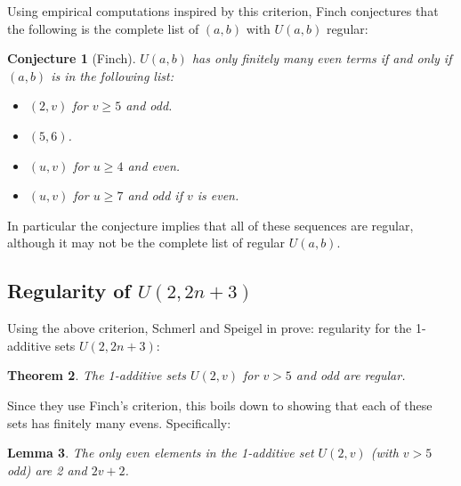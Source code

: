 \documentclass{report}
\newtheorem{theorem}{Theorem}[section]
\newtheorem{lemma}[theorem]{Lemma}
\newtheorem{conjecture}[theorem]{Conjecture}
\theoremstyle{remark}
\numberwithin{equation}{section}
\begin{document}
Using empirical computations inspired by this criterion, Finch
conjectures \cite{finch:em1992} that the following is the complete
list of $(a,b)$ with $U(a,b)$ regular:

\begin{conjecture}[Finch]
  $U(a,b)$ has only finitely many even terms if and only if $(a,b)$ is
  in the following list:

\begin{itemize}
\item $(2,v)$ for $v \geq 5$ and odd.
\item $(5,6)$.
\item $(u,v)$ for $u \geq 4$ and even.
\item $(u,v)$ for $u \geq 7$ and odd if $v$ is even.
\end{itemize}
\end{conjecture}

In particular the conjecture implies that all of these sequences are
regular, although it may not be the complete list of regular $U(a,b)$.

\subsection{Regularity of $U(2,2n+3)$}

Using the above criterion, Schmerl and Speigel in
\cite{schmerl:jct1994} prove: regularity for the 1-additive sets
$U(2, 2n+3)$:

\begin{theorem}
The 1-additive sets $U(2,v)$ for $v > 5$ and odd are regular.
\end{theorem}

Since they use Finch's criterion, this boils down to showing that each
of these sets has finitely many evens.  Specifically: 

\begin{lemma}The only even elements in the 1-additive set $U(2,v)$
  (with $v > 5$ odd) are 2 and $2v+2$.
\end{lemma}
\end{document}
